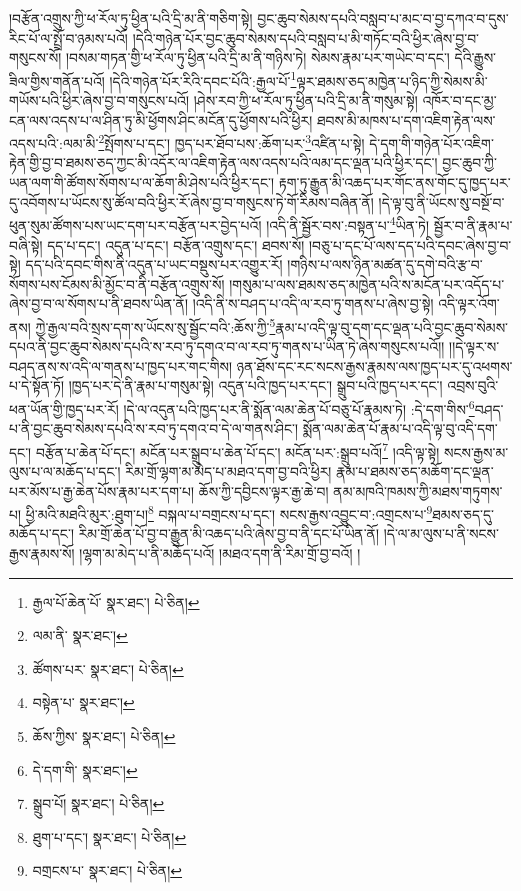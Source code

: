 །བརྩོན་འགྲུས་ཀྱི་ཕ་རོལ་ཏུ་ཕྱིན་པའི་དྲི་མ་ནི་གཅིག་སྟེ། བྱང་ཆུབ་སེམས་དཔའི་བསླབ་པ་མང་བ་བྱ་དཀའ་བ་དུས་རིང་པོ་ལ་སྤྲོ་བ་ཉམས་པའོ། །དེའི་གཉེན་པོར་བྱང་ཆུབ་སེམས་དཔའི་བསླབ་པ་མི་གཏོང་བའི་ཕྱིར་ཞེས་བྱ་བ་གསུངས་སོ། །བསམ་གཏན་གྱི་ཕ་རོལ་ཏུ་ཕྱིན་པའི་དྲི་མ་ནི་གཉིས་ཏེ། སེམས་རྣམ་པར་གཡེང་བ་དང་། དེའི་རྒྱུས་ཟིལ་གྱིས་གནོན་པའོ། །དེའི་གཉེན་པོར་རིའི་དབང་པོའི་:རྒྱལ་པོ་\footnote{རྒྱལ་པོ་ཆེན་པོ་  སྣར་ཐང་།  པེ་ཅིན། }ལྟར་ཐམས་ཅད་མཁྱེན་པ་ཉིད་ཀྱི་སེམས་མི་གཡོས་པའི་ཕྱིར་ཞེས་བྱ་བ་གསུངས་པའོ། །ཤེས་རབ་ཀྱི་ཕ་རོལ་ཏུ་ཕྱིན་པའི་དྲི་མ་ནི་གསུམ་སྟེ། འཁོར་བ་དང་མྱ་ངན་ལས་འདས་པ་ལ་ཤིན་ཏུ་མི་ཕྱོགས་ཤིང་མངོན་དུ་ཕྱོགས་པའི་ཕྱིར། ཐབས་མི་མཁས་པ་དག་འཇིག་རྟེན་ལས་འདས་པའི་:ལམ་མི་\footnote{ལམ་ནི་  སྣར་ཐང་། }སྤོགས་པ་དང་། ཁྱད་པར་ཐོབ་པས་:ཆོག་པར་\footnote{ཚོགས་པར་  སྣར་ཐང་།  པེ་ཅིན། }འཛིན་པ་སྟེ། དེ་དག་གི་གཉེན་པོར་འཇིག་རྟེན་གྱི་བྱ་བ་ཐམས་ཅད་ཀྱང་མི་འདོར་ལ་འཇིག་རྟེན་ལས་འདས་པའི་ལམ་དང་ལྡན་པའི་ཕྱིར་དང་། བྱང་ཆུབ་ཀྱི་ཡན་ལག་གི་ཚོགས་སོགས་པ་ལ་ཆོག་མི་ཤེས་པའི་ཕྱིར་དང་། རྟག་ཏུ་རྒྱུན་མི་འཆད་པར་གོང་ནས་གོང་དུ་ཁྱད་པར་དུ་འབོགས་པ་ཡོངས་སུ་ཚོལ་བའི་ཕྱིར་རོ་ཞེས་བྱ་བ་གསུངས་ཏེ་གོ་རིམས་བཞིན་ནོ། །དེ་ལྟ་བུ་ནི་ཡོངས་སུ་བསྔོ་བ་ཕུན་སུམ་ཚོགས་པས་ཡང་དག་པར་བརྩོན་པར་བྱེད་པའོ། །འདི་ནི་སྦྱོར་བས་:བསྟན་པ་\footnote{བསྟེན་པ་  སྣར་ཐང་། }ཡིན་ཏེ། སྦྱོར་བ་ནི་རྣམ་པ་བཞི་སྟེ། དད་པ་དང་། འདུན་པ་དང་། བརྩོན་འགྲུས་དང་། ཐབས་སོ། །བཅུ་པ་དང་པོ་ལས་དད་པའི་དབང་ཞེས་བྱ་བ་སྟེ། དད་པའི་དབང་གིས་ནི་འདུན་པ་ཡང་བསྡུས་པར་འགྱུར་རོ། །གཉིས་པ་ལས་ཉིན་མཚན་དུ་དགེ་བའི་རྩ་བ་སོགས་པས་ངོམས་མི་མྱོང་བ་ནི་བརྩོན་འགྲུས་སོ། །གསུམ་པ་ལས་ཐམས་ཅད་མཁྱེན་པའི་ས་མངོན་པར་འདོད་པ་ཞེས་བྱ་བ་ལ་སོགས་པ་ནི་ཐབས་ཡིན་ནོ། །འདི་ནི་ས་བཤད་པ་འདི་ལ་རབ་ཏུ་གནས་པ་ཞེས་བྱ་སྟེ། འདི་ལྟར་འོག་ནས། ཀྱེ་རྒྱལ་བའི་སྲས་དག་ས་ཡོངས་སུ་སྦྱོང་བའི་:ཆོས་ཀྱི་\footnote{ཆོས་ཀྱིས་  སྣར་ཐང་།  པེ་ཅིན། }རྣམ་པ་འདི་ལྟ་བུ་དག་དང་ལྡན་པའི་བྱང་ཆུབ་སེམས་དཔའ་ནི་བྱང་ཆུབ་སེམས་དཔའི་ས་རབ་ཏུ་དགའ་བ་ལ་རབ་ཏུ་གནས་པ་ཡིན་ཏེ་ཞེས་གསུངས་པའོ།། །།དེ་ལྟར་ས་བཤད་ནས་ས་འདི་ལ་གནས་པ་ཁྱད་པར་གང་གིས། ཉན་ཐོས་དང་རང་སངས་རྒྱས་རྣམས་ལས་ཁྱད་པར་དུ་འཕགས་པ་དེ་སྟོན་ཏོ། །ཁྱད་པར་དེ་ནི་རྣམ་པ་གསུམ་སྟེ། འདུན་པའི་ཁྱད་པར་དང་། སྒྲུབ་པའི་ཁྱད་པར་དང་། འབྲས་བུའི་ཕན་ཡོན་གྱི་ཁྱད་པར་རོ། །དེ་ལ་འདུན་པའི་ཁྱད་པར་ནི་སྨོན་ལམ་ཆེན་པོ་བཅུ་པོ་རྣམས་ཏེ། :དེ་དག་གིས་\footnote{དེ་དག་གི་  སྣར་ཐང་། }བཤད་པ་ནི་བྱང་ཆུབ་སེམས་དཔའི་ས་རབ་ཏུ་དགའ་བ་དེ་ལ་གནས་ཤིང་། སྨོན་ལམ་ཆེན་པོ་རྣམ་པ་འདི་ལྟ་བུ་འདི་དག་དང་། བརྩོན་པ་ཆེན་པོ་དང་། མངོན་པར་སྒྲུབ་པ་ཆེན་པོ་དང་། མངོན་པར་:སྒྲུབ་པའོ།\footnote{སྒྲུབ་པོ།  སྣར་ཐང་།  པེ་ཅིན། } །འདི་ལྟ་སྟེ། སངས་རྒྱས་མ་ལུས་པ་ལ་མཆོད་པ་དང་། རིམ་གྲོ་ལྷག་མ་མེད་པ་མཐའ་དག་བྱ་བའི་ཕྱིར། རྣམ་པ་ཐམས་ཅད་མཆོག་དང་ལྡན་པར་མོས་པ་རྒྱ་ཆེན་པོས་རྣམ་པར་དག་པ། ཆོས་ཀྱི་དབྱིངས་ལྟར་རྒྱ་ཆེ་བ། ནམ་མཁའི་ཁམས་ཀྱི་མཐས་གཏུགས་པ། ཕྱི་མའི་མཐའི་མུར་:ཐུག་པ།\footnote{ཐུག་པ་དང་།  སྣར་ཐང་།  པེ་ཅིན། } བསྐལ་པ་བགྲངས་པ་དང་། སངས་རྒྱས་འབྱུང་བ་:འགྲངས་པ་\footnote{བགྲངས་པ་  སྣར་ཐང་།  པེ་ཅིན། }ཐམས་ཅད་དུ་མཆོད་པ་དང་། རིམ་གྲོ་ཆེན་པོ་བྱ་བ་རྒྱུན་མི་འཆད་པའི་ཞེས་བྱ་བ་ནི་དང་པོ་ཡིན་ནོ། །དེ་ལ་མ་ལུས་པ་ནི་སངས་རྒྱས་རྣམས་སོ། །ལྷག་མ་མེད་པ་ནི་མཆོད་པའོ། །མཐའ་དག་ནི་རིམ་གྲོ་བྱ་བའོ། །
